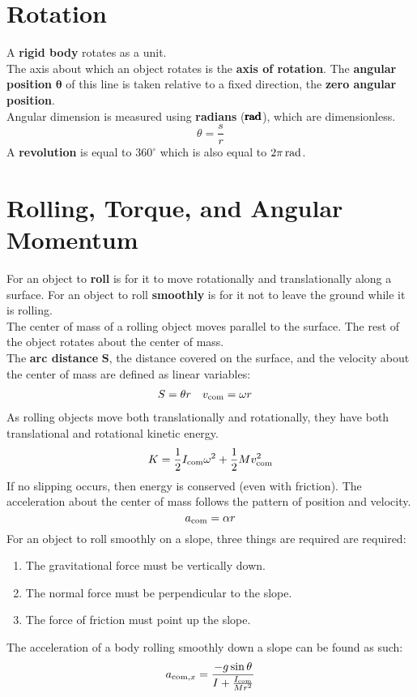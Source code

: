 \documentclass[../AP_Physics_C.tex]{subfiles}
\begin{document}
	\section{Rotation}
		A \textbf{rigid body} rotates as a unit. \\
		The axis about which an object rotates is the \textbf{axis of rotation}. The \textbf{angular position} $\pmb{\theta}$ of this line is taken relative to a fixed direction, the \textbf{zero angular position}. \\
		Angular dimension is measured using \textbf{radians} ($\pmb{\operatorname{\mathrm{rad}}}$), which are dimensionless.
		\[\theta = \frac{s}{r}\]
		A \textbf{revolution} is equal to $360^\circ$ which is also equal to $2\pi\operatorname{\mathrm{rad}}$.
	\section{Rolling, Torque, and Angular Momentum}
		For an object to \textbf{roll} is for it to move rotationally and translationally along a surface. For an object to roll \textbf{smoothly} is for it not to leave the ground while it is rolling. \\
		The center of mass of a rolling object moves parallel to the surface. The rest of the object rotates about the center of mass. \\
		The \textbf{arc distance} $\pmb{S}$, the distance covered on the surface, and the velocity about the center of mass are defined as linear variables:
		\begin{align*}
			S &= \theta r & v_{\mathrm{com}} &= \omega r
		\end{align*}
		As rolling objects move both translationally and rotationally, they have both translational and rotational kinetic energy.
		\[K = \frac{1}{2}I_{\mathrm{com}}\omega^2 + \frac{1}{2}Mv_{\mathrm{com}}^2\]
		If no slipping occurs, then energy is conserved (even with friction).
		The acceleration about the center of mass follows the pattern of position and velocity.
		\[a_{\mathrm{com}} = \alpha r\]
		For an object to roll smoothly on a slope, three things are required are required:
		\begin{enumerate}
			\item
				The gravitational force must be vertically down.
			\item
				The normal force must be perpendicular to the slope.
			\item
				The force of friction must point up the slope.
		\end{enumerate}
		The acceleration of a body rolling smoothly down a slope can be found as such:
		\[a_{\mathrm{com},x} = \frac{-g\sin\theta}{I + \frac{I_{\mathrm{com}}}{Mr^2}}\]
\end{document}
